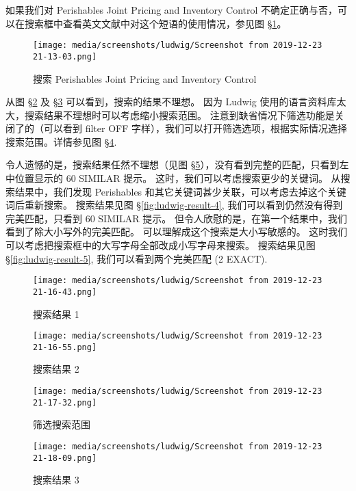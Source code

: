 \documentclass[
    11pt,
    base=hide,
    cite=authoryear,
    device=phone,
    lang=cn,
    mode=simple,
    result=answer,
    toc=onecol,
]{elegantbook_sierxue}
\begin{document}
如果我们对 Perishables Joint Pricing and Inventory Control
不确定正确与否，可以在搜索框中查看英文文献中对这个短语的使用情况，参见图
\S\ref{fig:ludwig-search}。

\begin{figure}[!htbp]
  \centering
  \texttt{[image: media/screenshots/ludwig/Screenshot from 2019-12-23 21-13-03.png]}
  \caption{搜索 Perishables Joint Pricing and Inventory Control}%
  \label{fig:ludwig-search}
\end{figure}

从图 \S\ref{fig:ludwig-result-1} 及 \S\ref{fig:ludwig-result-2}
可以看到，搜索的结果不理想。
因为 Ludwig 使用的语言资料库太大，搜索结果不理想时可以考虑缩小搜索范围。
注意到缺省情况下筛选功能是关闭了的（可以看到 filter OFF
字样），我们可以打开筛选选项，根据实际情况选择搜索范围。详情参见图
\S\ref{fig:ludwig-filter}.

令人遗憾的是，搜索结果任然不理想（见图
\S\ref{fig:ludwig-result-3}），没有看到完整的匹配，只看到左中位置显示的 60
SIMILAR 提示。
这时，我们可以考虑搜索更少的关键词。
从搜索结果中，我们发现 Perishables
和其它关键词甚少关联，可以考虑去掉这个关键词后重新搜索。
搜索结果见图 \S\ref{fig:ludwig-result-4},
我们可以看到仍然没有得到完美匹配，只看到 60 SIMILAR 提示。
但令人欣慰的是，在第一个结果中，我们看到了除大小写外的完美匹配。
可以理解成这个搜索是大小写敏感的。
这时我们可以考虑把搜索框中的大写字母全部改成小写字母来搜索。
搜索结果见图 \S\ref{fig:ludwig-result-5}, 我们可以看到两个完美匹配
(2 EXACT).

\begin{figure}[!htbp]
  \centering
  \texttt{[image: media/screenshots/ludwig/Screenshot from 2019-12-23 21-16-43.png]}
  \caption{搜索结果 1}%
  \label{fig:ludwig-result-1}
\end{figure}

\begin{figure}[!htbp]
  \centering
  \texttt{[image: media/screenshots/ludwig/Screenshot from 2019-12-23 21-16-55.png]}
  \caption{搜索结果 2}%
  \label{fig:ludwig-result-2}
\end{figure}

\begin{figure}[!htbp]
  \centering
  \texttt{[image: media/screenshots/ludwig/Screenshot from 2019-12-23 21-17-32.png]}
  \caption{筛选搜索范围}%
  \label{fig:ludwig-filter}
\end{figure}

\begin{figure}[!htbp]
  \centering
  \texttt{[image: media/screenshots/ludwig/Screenshot from 2019-12-23 21-18-09.png]}
  \caption{搜索结果 3}%
  \label{fig:ludwig-result-3}
\end{figure}
\end{document}
